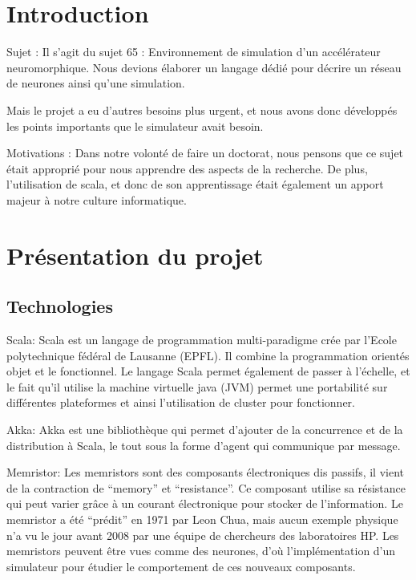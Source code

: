 \documentclass{article}
\begin{document}
\tableofcontents

\newpage


\section*{Introduction}

Sujet : 
    Il s’agit du sujet 65 : Environnement de simulation d'un accélérateur neuromorphique. Nous devions élaborer un langage dédié pour décrire un réseau de neurones ainsi qu’une simulation.

Mais le projet a eu d’autres besoins plus urgent, et nous avons donc développés les points importants que le simulateur avait besoin.

Motivations : 
    Dans notre volonté de faire un doctorat, nous pensons que ce sujet était approprié pour nous apprendre des aspects de la recherche. De plus, l’utilisation de scala, et donc de son apprentissage était également un apport majeur à notre culture informatique. 
		

\section{Présentation du projet}

\subsection{Technologies}
        Scala: Scala est un langage de programmation multi-paradigme crée par l’Ecole polytechnique fédéral de Lausanne (EPFL). Il combine la programmation orientés objet et le fonctionnel. Le langage Scala permet également de passer à l’échelle, et le fait qu’il utilise la machine virtuelle java (JVM) permet une portabilité sur différentes plateformes et ainsi l’utilisation de cluster pour fonctionner.

        Akka: Akka est une bibliothèque qui permet d’ajouter de la concurrence et de la distribution à Scala, le tout sous la forme d’agent qui communique par message.

        Memristor: Les memristors sont des composants électroniques dis passifs, il vient de la contraction de “memory” et “resistance”. Ce composant utilise sa résistance qui peut varier grâce à un courant électronique pour stocker de l’information. Le memristor a été “prédit” en 1971 par Leon Chua, mais aucun exemple physique n’a vu le jour avant 2008 par une équipe de chercheurs des laboratoires HP. Les memristors peuvent être vues comme des neurones, d’où l’implémentation d’un simulateur pour étudier le comportement de ces nouveaux composants.
        
\end{document}
